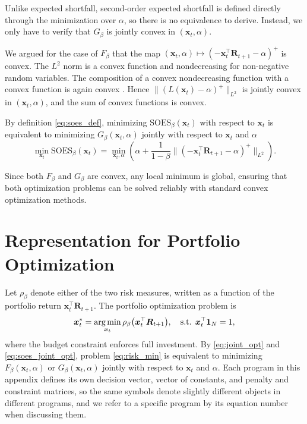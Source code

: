 Unlike expected shortfall, second-order expected shortfall is defined directly through the minimization over $\alpha$,
so there is no equivalence to derive. Instead, we only have to verify that $G_\beta$ is jointly convex in $(\bm{x}_t, \alpha)$.  

We argued for the case of $F_\beta$ that the map $(\bm{x}_t, \alpha) \mapsto (-\bm{x}_t^\top \bm{R}_{t+1} - \alpha)^+$ is convex. The $L^2$ norm is a convex function \cite[Section~3.1.5]{boyd2004convex} and nondecreasing for non-negative random variables.  The composition of a convex nondecreasing function with a convex
function is again convex \cite[Section~3.2.4]{boyd2004convex}. Hence $\big\| (L(\bm{x}_t) - \alpha)^+ \big\|_{L^2} $ is jointly convex in $(\bm{x}_t, \alpha)$, and the sum of convex functions is convex. 

By definition \eqref{eq:soes_def}, minimizing $\text{SOES}_\beta(\bm{x}_t)$ with respect to $\bm{x}_t$ is
equivalent to minimizing $G_\beta(\bm{x}_t, \alpha)$ jointly with respect to $\bm{x}_t$ and $\alpha$
\begin{equation} \label{eq:soes_joint_opt}
    \min_{\bm{x}_t} \text{SOES}_\beta(\bm{x}_t) = \min_{\bm{x}_t, \alpha} \left( \alpha + \frac{1}{1-\beta}
    \big\| (-\bm{x}_t^\top \bm{R}_{t+1} - \alpha)^+ \big\|_{L^2} \right).
\end{equation}

Since both $F_\beta$ and $G_\beta$ are convex, any local minimum is global, ensuring that
both optimization problems can be solved reliably with standard convex optimization methods.

\section{Representation for Portfolio Optimization} \label{app:linear-program-representation}
 
Let $\rho_\beta$ denote either of the two risk measures, written as a
function of the portfolio return $\bm{x}_t^\top \bm{R}_{t+1}$. The portfolio optimization problem is
\begin{equation} \label{eq:risk_min}
    \bm{x}_t^* = \operatorname*{arg\,min}_{\bm{x}_t} \rho_\beta\bigl( \bm{x}_t^\top \bm{R}_{t+1} \bigr), \quad \text{s.t. } \bm{x}_t^\top \bm{1}_N = 1,
\end{equation}
where the budget constraint enforces full investment. By \eqref{eq:joint_opt} and \eqref{eq:soes_joint_opt}, problem
\eqref{eq:risk_min} is equivalent to minimizing $F_\beta(\bm{x}_t, \alpha)$ or $G_\beta(\bm{x}_t, \alpha)$ jointly
with respect to $\bm{x}_t$ and $\alpha$.
Each program in this appendix defines its own decision vector, vector of constants, and penalty and constraint matrices, so
the same symbols denote slightly different objects in different programs, and we refer to a specific program by its equation
number when discussing them. 


